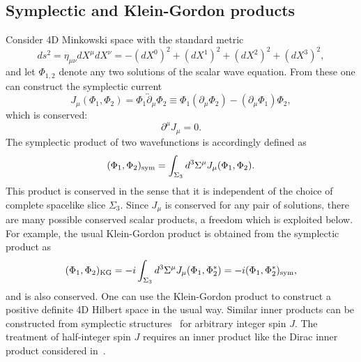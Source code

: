 \documentclass[11pt]{article}
\def\p{\partial}
\def\ee{\end{equation}}
\def\be {\begin{equation}}
\numberwithin{equation}{section}
\begin{document}
\subsection{Symplectic and Klein-Gordon products}  
Consider 4D Minkowski space with the standard metric 
\begin{equation}
ds^2 = \eta_{\mu\nu}dX^\mu dX^\nu = -\left(dX^0\right)^2+\left(dX^1\right)^2+\left(dX^2\right)^2+\left(dX^3\right)^2 ,
\end{equation}
and let $\Phi_{1,2}$ denote any two solutions of the scalar wave equation. From these one can construct the symplectic current
\be J_\mu(\Phi_1,\Phi_2)=\Phi_1\overleftrightarrow \p_\mu \Phi_2 \equiv \Phi_1(\partial_\mu\Phi_2)-(\partial_\mu\Phi_1)\Phi_2,
\ee
which is conserved: 
\be 
\p^\mu J_\mu=0.
\ee
The symplectic product of two wavefunctions is accordingly defined as 
\begin{equation}
(\Phi_1,\Phi_2)_{\rm sym} = \int_{\Sigma_3} d^3\Sigma^\mu J_\mu(\Phi_1,\Phi_2).
\end{equation}
This product is conserved in the sense that it is independent of the choice of complete spacelike slice $\Sigma_3$.  
Since $J_\mu$ is conserved for any pair of solutions, there are many possible conserved scalar products, a freedom which is exploited below. For example, the usual  Klein-Gordon product is obtained from the symplectic product as
\begin{equation}
(\Phi_1,\Phi_2)_{\rm{KG}} =-i\int_{\Sigma_3} d^3\Sigma^\mu J_\mu(\Phi_1,\Phi_2^*) =-i(\Phi_1, \Phi_2^\ast)_{\rm{sym}},
\end{equation}
and is also conserved. One can use the Klein-Gordon product to construct a positive definite 4D Hilbert space in the usual way. Similar inner products can be constructed from symplectic structures~\cite{Ashtekar:1987tt} for arbitrary integer spin $J$. The treatment of half-integer spin $J$ requires an inner product like the Dirac inner product considered in~\cite{Fotopoulos:2020bqj,Narayanan:2020amh,Mueck:2020wtx}.
\end{document}
